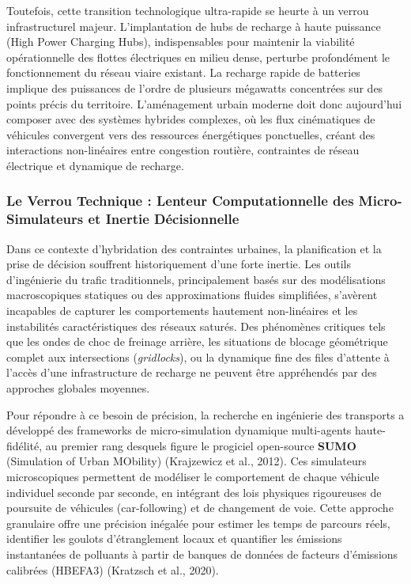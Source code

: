 \documentclass[10pt, a4paper]{article}
\begin{document}
Toutefois, cette transition technologique ultra-rapide se heurte à un
verrou infrastructurel majeur. L'implantation de hubs de recharge à
haute puissance (High Power Charging Hubs), indispensables pour
maintenir la viabilité opérationnelle des flottes électriques en milieu
dense, perturbe profondément le fonctionnement du réseau viaire
existant. La recharge rapide de batteries implique des puissances de
l'ordre de plusieurs mégawatts concentrées sur des points précis du
territoire. L'aménagement urbain moderne doit donc aujourd'hui composer
avec des systèmes hybrides complexes, où les flux cinématiques de
véhicules convergent vers des ressources énergétiques ponctuelles,
créant des interactions non-linéaires entre congestion routière,
contraintes de réseau électrique et dynamique de recharge.

\subsubsection{Le Verrou Technique : Lenteur Computationnelle des
Micro-Simulateurs et Inertie
Décisionnelle}\label{le-verrou-technique-lenteur-computationnelle-des-micro-simulateurs-et-inertie-duxe9cisionnelle}

Dans ce contexte d'hybridation des contraintes urbaines, la
planification et la prise de décision souffrent historiquement d'une
forte inertie. Les outils d'ingénierie du trafic traditionnels,
principalement basés sur des modélisations macroscopiques statiques ou
des approximations fluides simplifiées, s'avèrent incapables de capturer
les comportements hautement non-linéaires et les instabilités
caractéristiques des réseaux saturés. Des phénomènes critiques tels que
les ondes de choc de freinage arrière, les situations de blocage
géométrique complet aux intersections (\emph{gridlocks}), ou la
dynamique fine des files d'attente à l'accès d'une infrastructure de
recharge ne peuvent être appréhendés par des approches globales
moyennes.

Pour répondre à ce besoin de précision, la recherche en ingénierie des
transports a développé des frameworks de micro-simulation dynamique
multi-agents haute-fidélité, au premier rang desquels figure le
progiciel open-source \textbf{SUMO} (Simulation of Urban MObility)
(Krajzewicz et al., 2012). Ces simulateurs microscopiques permettent de
modéliser le comportement de chaque véhicule individuel seconde par
seconde, en intégrant des lois physiques rigoureuses de poursuite de
véhicules (car-following) et de changement de voie. Cette approche
granulaire offre une précision inégalée pour estimer les temps de
parcours réels, identifier les goulots d'étranglement locaux et
quantifier les émissions instantanées de polluants à partir de banques
de données de facteurs d'émissions calibrées (HBEFA3) (Kratzsch et al.,
2020).
\end{document}
